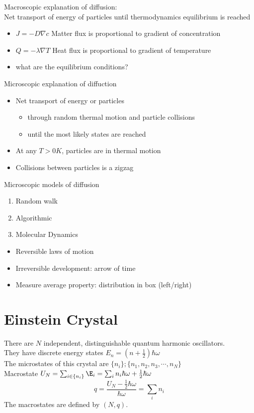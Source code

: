 \documentclass[]{scrartcl}
\begin{document}
Macroscopic explanation of diffusion:\\
Net transport of energy of particles until thermodynamics equilibrium is reached

\begin{itemize}
	\item $J = -D\nabla c$ Matter flux is proportional to gradient of concentration
	\item $Q = -\lambda\nabla T$ Heat flux is proportional to gradient of temperature
	\item what are the equilibrium conditions?
\end{itemize}

Microscopic explanation of diffuction
\begin{itemize}
	\item[] Net transport of energy or particles
		\begin{itemize}
			\item through random thermal motion and particle collisions
			\item until the most likely states are reached
		\end{itemize}
	\item At any $T>0K$, particles are in thermal motion
	\item Collisions between particles is a zigzag
\end{itemize}

Microscopic models of diffusion
\begin{enumerate}
	\item Random walk
	\item Algorithmic
	\item Molecular Dynamics
\end{enumerate}
\begin{itemize}
	\item Reversible laws of motion
	\item Irreversible development: arrow of time
	\item Measure average property: distribution in box (left/right)
\end{itemize}

\section{Einstein Crystal}

There are $N$ independent, distinguishable quantum harmonic oscillators.\\
They have discrete energy states $E_n = (n + \frac{1}{2})\hbar\omega$\\
The microstates of this crystal are $\{n_i\}; \{n_1, n_2, n_3, \cdots, n_N\}$\\
Macrostate $U_N = \sum_{i \in \{n_i\}} \E_i = \sum_i n_i\hbar\omega + \frac{1}{2}\hbar\omega$
\begin{equation}
	q = \frac{U_N - \frac{1}{2}\hbar\omega}{\hbar\omega} = \sum_i n_i
\end{equation}
The macrostates are defined by $(N,q)$.
\end{document}
